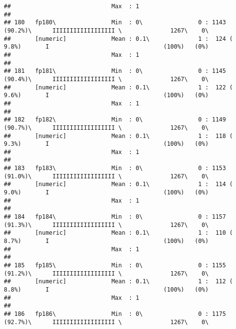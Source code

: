 \documentclass[]{article}
\begin{document}
\begin{verbatim}
##                             Max  : 1                                                                                            
## 
## 180   fp180\                Min  : 0\                0 : 1143 (90.2%)\      IIIIIIIIIIIIIIIIII \              1267\    0\       
##       [numeric]             Mean : 0.1\              1 :  124 ( 9.8%)       I                                 (100%)   (0%)     
##                             Max  : 1                                                                                            
## 
## 181   fp181\                Min  : 0\                0 : 1145 (90.4%)\      IIIIIIIIIIIIIIIIII \              1267\    0\       
##       [numeric]             Mean : 0.1\              1 :  122 ( 9.6%)       I                                 (100%)   (0%)     
##                             Max  : 1                                                                                            
## 
## 182   fp182\                Min  : 0\                0 : 1149 (90.7%)\      IIIIIIIIIIIIIIIIII \              1267\    0\       
##       [numeric]             Mean : 0.1\              1 :  118 ( 9.3%)       I                                 (100%)   (0%)     
##                             Max  : 1                                                                                            
## 
## 183   fp183\                Min  : 0\                0 : 1153 (91.0%)\      IIIIIIIIIIIIIIIIII \              1267\    0\       
##       [numeric]             Mean : 0.1\              1 :  114 ( 9.0%)       I                                 (100%)   (0%)     
##                             Max  : 1                                                                                            
## 
## 184   fp184\                Min  : 0\                0 : 1157 (91.3%)\      IIIIIIIIIIIIIIIIII \              1267\    0\       
##       [numeric]             Mean : 0.1\              1 :  110 ( 8.7%)       I                                 (100%)   (0%)     
##                             Max  : 1                                                                                            
## 
## 185   fp185\                Min  : 0\                0 : 1155 (91.2%)\      IIIIIIIIIIIIIIIIII \              1267\    0\       
##       [numeric]             Mean : 0.1\              1 :  112 ( 8.8%)       I                                 (100%)   (0%)     
##                             Max  : 1                                                                                            
## 
## 186   fp186\                Min  : 0\                0 : 1175 (92.7%)\      IIIIIIIIIIIIIIIIII \              1267\    0\       

\end{verbatim}
\end{document}
